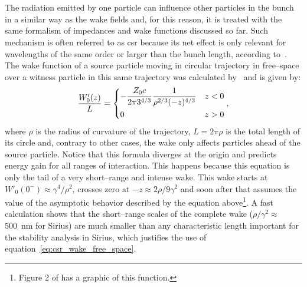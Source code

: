 \section{}\label{sec:csr_impedance}

    The radiation emitted by one particle can influence other particles in the bunch in a similar way as the wake fields and, for this reason, it is treated with the same formalism of impedances and wake functions discussed so far. Such mechanism is often referred to as \gls{csr} because its net effect is only relevant for wavelengths of the same order or larger than the bunch length, according to~. The wake function of a source particle moving in circular trajectory in free--space over a witness particle in this same trajectory was calculated by~ and is given by:
    \begin{align}\label{eq:csr_wake_free_space}
        \frac{W'_0(z)}{L} =
        \begin{dcases}
            -\frac{Z_0 c}{2 \pi 3^{4/3}} \frac{1}{\rho^{2/3}(-z)^{4/3}} & z<0\\
            0 & z>0
        \end{dcases},
    \end{align}
    where $\rho$ is the radius of curvature of the trajectory, $L=2\pi\rho$ is the total length of its circle and, contrary to other cases, the wake only affects particles ahead of the source particle. Notice that this formula diverges at the origin and predicts energy gain for all ranges of interaction. This happens because this equation is only the tail of a very short--range and intense wake. This wake starts at $W'_0(0^-)\approx\gamma^4/\rho^2$, crosses zero at $-z\approx 2\rho / 9\gamma^2$ and soon after that assumes the value of the asymptotic behavior described by the equation above\footnote{Figure 2 of   has a graphic of this function.}. A fast calculation shows that the short--range scales of the complete wake ($\rho/\gamma^2 \approx $\SI{500}{\nano\meter} for Sirius) are much smaller than any characteristic length important for the stability analysis in Sirius, which justifies the use of equation~\eqref{eq:csr_wake_free_space}.

